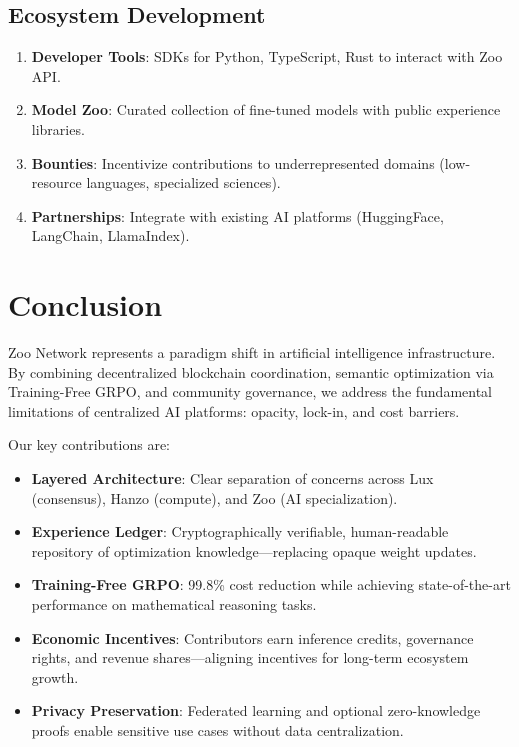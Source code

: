 \documentclass[11pt,a4paper]{article}
\begin{document}
\subsection{Ecosystem Development}

\begin{enumerate}
\item \textbf{Developer Tools}: SDKs for Python, TypeScript, Rust to interact with Zoo API.
\item \textbf{Model Zoo}: Curated collection of fine-tuned models with public experience libraries.
\item \textbf{Bounties}: Incentivize contributions to underrepresented domains (low-resource languages, specialized sciences).
\item \textbf{Partnerships}: Integrate with existing AI platforms (HuggingFace, LangChain, LlamaIndex).
\end{enumerate}

\section{Conclusion}

Zoo Network represents a paradigm shift in artificial intelligence infrastructure. By combining decentralized blockchain coordination, semantic optimization via Training-Free GRPO, and community governance, we address the fundamental limitations of centralized AI platforms: opacity, lock-in, and cost barriers.

Our key contributions are:
\begin{itemize}
\item \textbf{Layered Architecture}: Clear separation of concerns across Lux (consensus), Hanzo (compute), and Zoo (AI specialization).
\item \textbf{Experience Ledger}: Cryptographically verifiable, human-readable repository of optimization knowledge—replacing opaque weight updates.
\item \textbf{Training-Free GRPO}: 99.8\% cost reduction while achieving state-of-the-art performance on mathematical reasoning tasks.
\item \textbf{Economic Incentives}: Contributors earn inference credits, governance rights, and revenue shares—aligning incentives for long-term ecosystem growth.
\item \textbf{Privacy Preservation}: Federated learning and optional zero-knowledge proofs enable sensitive use cases without data centralization.
\end{itemize}
\end{document}

